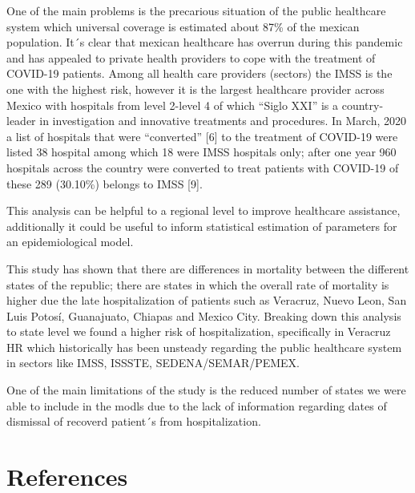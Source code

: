 \documentclass[10pt,letterpaper]{article}
\begin{document}
One of the main problems is the precarious situation of the public
healthcare system which universal coverage is estimated about 87\% of
the mexican population. It´s clear that mexican healthcare has overrun
during this pandemic and has appealed to private health providers to
cope with the treatment of COVID-19 patients. Among all health care
providers (sectors) the IMSS is the one with the highest risk, however
it is the largest healthcare provider across Mexico with hospitals from
level 2-level 4 of which ``Siglo XXI'' is a country-leader in
investigation and innovative treatments and procedures. In March, 2020 a
list of hospitals that were ``converted'' {[}6{]} to the treatment of
COVID-19 were listed 38 hospital among which 18 were IMSS hospitals
only; after one year 960 hospitals across the country were converted to
treat patients with COVID-19 of these 289 (30.10\%) belongs to IMSS
{[}9{]}.

This analysis can be helpful to a regional level to improve healthcare
assistance, additionally it could be useful to inform statistical
estimation of parameters for an epidemiological model.

This study has shown that there are differences in mortality between the
different states of the republic; there are states in which the overall
rate of mortality is higher due the late hospitalization of patients
such as Veracruz, Nuevo Leon, San Luis Potosí, Guanajuato, Chiapas and
Mexico City. Breaking down this analysis to state level we found a
higher risk of hospitalization, specifically in Veracruz HR which
historically has been unsteady regarding the public healthcare system in
sectors like IMSS, ISSSTE, SEDENA/SEMAR/PEMEX.

One of the main limitations of the study is the reduced number of states
we were able to include in the modls due to the lack of information
regarding dates of dismissal of recoverd patient´s from hospitalization.

\hypertarget{references}{%
\section*{References}\label{references}}
\end{document}
